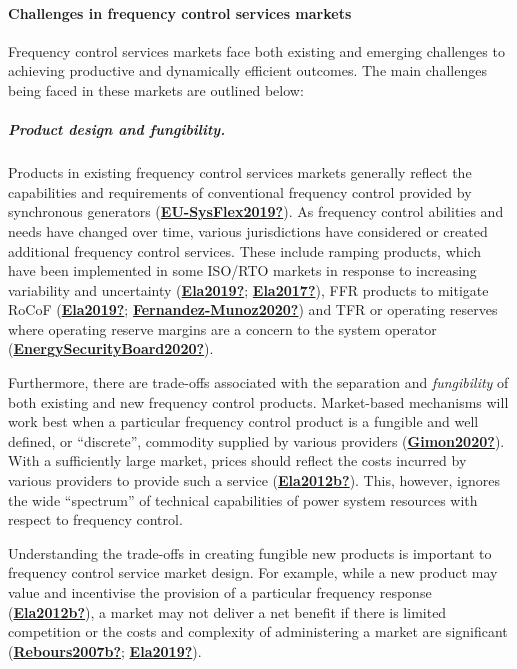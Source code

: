 \documentclass[12pt,a4paper,]{report}
\begin{document}
\hypertarget{sec:challgnes_fcas_markets}{%
\paragraph{Challenges in frequency control services
markets}\label{sec:challgnes_fcas_markets}}

Frequency control services markets face both existing and emerging
challenges to achieving productive and dynamically efficient outcomes.
The main challenges being faced in these markets are outlined below:

\hypertarget{product-design-and-fungibility.}{%
\subparagraph{Product design and
fungibility.}\label{product-design-and-fungibility.}}

Products in existing frequency control services markets generally
reflect the capabilities and requirements of conventional frequency
control provided by synchronous generators
(\protect\hyperlink{ref-EU-SysFlex2019}{\textbf{EU-SysFlex2019?}}). As
frequency control abilities and needs have changed over time, various
jurisdictions have considered or created additional frequency control
services. These include ramping products, which have been implemented in
some ISO/RTO markets in response to increasing variability and
uncertainty (\protect\hyperlink{ref-Ela2019}{\textbf{Ela2019?}};
\protect\hyperlink{ref-Ela2017}{\textbf{Ela2017?}}), FFR products to
mitigate RoCoF (\protect\hyperlink{ref-Ela2019}{\textbf{Ela2019?}};
\protect\hyperlink{ref-Fernandez-Munoz2020}{\textbf{Fernandez-Munoz2020?}})
and TFR or operating reserves where operating reserve margins are a
concern to the system operator
(\protect\hyperlink{ref-EnergySecurityBoard2020}{\textbf{EnergySecurityBoard2020?}}).

Furthermore, there are trade-offs associated with the separation and
\emph{fungibility} of both existing and new frequency control products.
Market-based mechanisms will work best when a particular frequency
control product is a fungible and well defined, or ``discrete'',
commodity supplied by various providers
(\protect\hyperlink{ref-Gimon2020}{\textbf{Gimon2020?}}). With a
sufficiently large market, prices should reflect the costs incurred by
various providers to provide such a service
(\protect\hyperlink{ref-Ela2012b}{\textbf{Ela2012b?}}). This, however,
ignores the wide ``spectrum'' of technical capabilities of power system
resources with respect to frequency control.

Understanding the trade-offs in creating fungible new products is
important to frequency control service market design. For example, while
a new product may value and incentivise the provision of a particular
frequency response
(\protect\hyperlink{ref-Ela2012b}{\textbf{Ela2012b?}}), a market may not
deliver a net benefit if there is limited competition or the costs and
complexity of administering a market are significant
(\protect\hyperlink{ref-Rebours2007b}{\textbf{Rebours2007b?}};
\protect\hyperlink{ref-Ela2019}{\textbf{Ela2019?}}).
\end{document}
